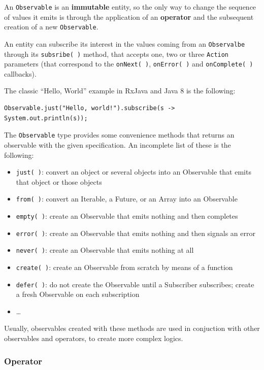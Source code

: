 An \texttt{Observable} is an \textbf{immutable} entity, so the only way
to change the sequence of values it emits is through the application of
an \textbf{operator} and the subsequent creation of a new
\texttt{Observable}.

An entity can subscribe its interest in the values coming from an
\texttt{Observalbe} through its \texttt{subsribe(\ )} method, that
accepts one, two or three \texttt{Action} parameters (that correspond to
the \texttt{onNext(\ )}, \texttt{onError(\ )} and
\texttt{onComplete(\ )} callbacks).

The classic ``Hello, World'' example in RxJava and Java 8 is the
following:

\begin{verbatim}
Observable.just("Hello, world!").subscribe(s -> System.out.println(s));
\end{verbatim}

The \texttt{Observable} type provides some convenience methods that
returns an observable with the given specification. An incomplete list
of these is the following:

\begin{itemize}
\itemsep1pt\parskip0pt
\item
  \texttt{just(\ )}: convert an object or several objects into an
  Observable that emits that object or those objects
\item
  \texttt{from(\ )}: convert an Iterable, a Future, or an Array into an
  Observable
\item
  \texttt{empty(\ )}: create an Observable that emits nothing and then
  completes
\item
  \texttt{error(\ )}: create an Observable that emits nothing and then
  signals an error
\item
  \texttt{never(\ )}: create an Observable that emits nothing at all
\item
  \texttt{create(\ )}: create an Observable from scratch by means of a
  function
\item
  \texttt{defer(\ )}: do not create the Observable until a Subscriber
  subscribes; create a fresh Observable on each subscription
\item
  \ldots{}
\end{itemize}

Usually, observables created with these methods are used in conjuction
with other observables and operators, to create more complex logics.

\subsubsection{Operator}\label{operator}

